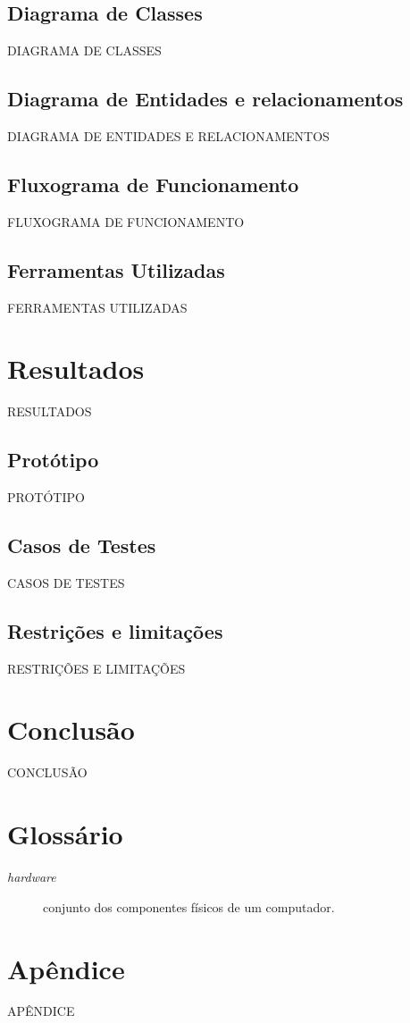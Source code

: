 \documentclass[oneside]{ifrs}
\begin{document}
\section{Diagrama de Classes}
DIAGRAMA DE CLASSES

\section{Diagrama de Entidades e relacionamentos}
DIAGRAMA DE ENTIDADES E RELACIONAMENTOS

\section{Fluxograma de Funcionamento}
FLUXOGRAMA DE FUNCIONAMENTO

\section{Ferramentas Utilizadas}
FERRAMENTAS UTILIZADAS

\chapter{Resultados}
RESULTADOS

\section{Protótipo}
PROTÓTIPO

\section{Casos de Testes}
CASOS DE TESTES

\section{Restrições e limitações}
RESTRIÇÕES E LIMITAÇÕES

\chapter{Conclusão}
CONCLUSÃO



\chapter*{Glossário} 

\begin{description} 
	\item[\textit{hardware}] conjunto dos componentes físicos de um computador.
\end{description} 

\appendix

\chapter{Apêndice}
APÊNDICE
\end{document}
